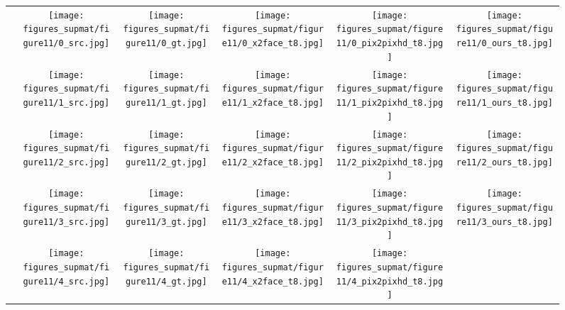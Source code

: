 \documentclass[10pt,twocolumn,letterpaper]{article}
\begin{document}
\begin{figure*}
    \centering    
    \setlength{\wid}{0.179\textwidth}
    \addtolength{\tabcolsep}{-4pt}
    \begin{tabular}{m{0.6cm}c:cccc}
        &
        \texttt{[image: figures\_supmat/figure11/0\_src.jpg]}
        \;&\;
        \texttt{[image: figures\_supmat/figure11/0\_gt.jpg]}&
        \texttt{[image: figures\_supmat/figure11/0\_x2face\_t8.jpg]}&
        \texttt{[image: figures\_supmat/figure11/0\_pix2pixhd\_t8.jpg]}&
        \texttt{[image: figures\_supmat/figure11/0\_ours\_t8.jpg]}\\
        &
        \texttt{[image: figures\_supmat/figure11/1\_src.jpg]}
        \;&\;
        \texttt{[image: figures\_supmat/figure11/1\_gt.jpg]}&
        \texttt{[image: figures\_supmat/figure11/1\_x2face\_t8.jpg]}&
        \texttt{[image: figures\_supmat/figure11/1\_pix2pixhd\_t8.jpg]}&
        \texttt{[image: figures\_supmat/figure11/1\_ours\_t8.jpg]}\\
        &
        \texttt{[image: figures\_supmat/figure11/2\_src.jpg]}
        \;&\;
        \texttt{[image: figures\_supmat/figure11/2\_gt.jpg]}&
        \texttt{[image: figures\_supmat/figure11/2\_x2face\_t8.jpg]}&
        \texttt{[image: figures\_supmat/figure11/2\_pix2pixhd\_t8.jpg]}&
        \texttt{[image: figures\_supmat/figure11/2\_ours\_t8.jpg]}\\
        &
        \texttt{[image: figures\_supmat/figure11/3\_src.jpg]}
        \;&\;
        \texttt{[image: figures\_supmat/figure11/3\_gt.jpg]}&
        \texttt{[image: figures\_supmat/figure11/3\_x2face\_t8.jpg]}&
        \texttt{[image: figures\_supmat/figure11/3\_pix2pixhd\_t8.jpg]}&
        \texttt{[image: figures\_supmat/figure11/3\_ours\_t8.jpg]}\\
        &
        \texttt{[image: figures\_supmat/figure11/4\_src.jpg]}
        \;&\;
        \texttt{[image: figures\_supmat/figure11/4\_gt.jpg]}&
        \texttt{[image: figures\_supmat/figure11/4\_x2face\_t8.jpg]}&
        \texttt{[image: figures\_supmat/figure11/4\_pix2pixhd\_t8.jpg]}&

\end{tabular}
\end{figure*}
\end{document}
